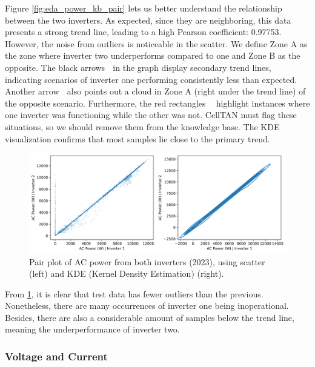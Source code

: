 Figure \ref{fig:eda_power_kb_pair} lets us better understand the relationship between the two inverters. As expected, since they are neighboring, this data presents a strong trend line, leading to a high Pearson coefficient: 0.97753. However, the noise from outliers is noticeable in the scatter. We define Zone A as the zone where inverter two underperforms compared to one and Zone B as the opposite. The black arrows \textcircled{} in the graph display secondary trend lines, indicating scenarios of inverter one performing consistently less than expected. Another arrow \textcircled{} also points out a cloud in Zone A (right under the trend line) of the opposite scenario. Furthermore, the red rectangles \textcircled{}\textcircled{} highlight instances where one inverter was functioning while the other was not. CellTAN must flag these situations, so we should remove them from the knowledge base. The KDE visualization confirms that most samples lie close to the primary trend.

\begin{figure}[h!]
    \centering
    \includegraphics[width=\textwidth]{figures/chapter5/analysis/03_power_pairplots_test-1.png}
    \caption{Pair plot of AC power from both inverters (2023), using scatter (left) and KDE (Kernel Density Estimation) (right).}
    \label{fig:eda_power_test_pair}
\end{figure}

From \ref{fig:eda_power_test_pair}, it is clear that test data has fewer outliers than the previous. Nonetheless, there are many occurrences of inverter one being inoperational. Besides, there are also a considerable amount of samples below the trend line, meaning the underperformance of inverter two.

\subsubsection{Voltage and Current} \label{subsubsec:eda_volt_curr}

